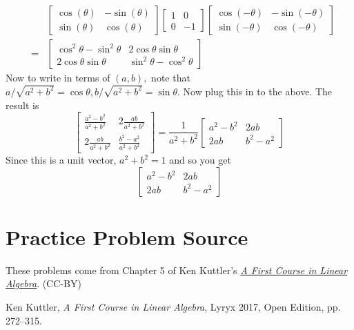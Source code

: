 \documentclass{ximera}
\begin{document}
\begin{problem}
\begin{hint}
\begin{eqnarray*}
&&\left[
\begin{array}{cc}
\cos \left( \theta \right) & -\sin \left( \theta \right) \\
\sin \left( \theta \right) & \cos \left( \theta \right)
\end{array}
\right] \left[
\begin{array}{rr}
1 & 0 \\
0 & -1
\end{array}
\right] \left[
\begin{array}{cc}
\cos \left( -\theta \right) & -\sin \left( -\theta \right) \\
\sin \left( -\theta \right) & \cos \left( -\theta \right)
\end{array}
\right] \\
&=& \left[
\begin{array}{cc}
\cos ^{2}\theta -\sin ^{2}\theta & 2\cos \theta \sin \theta \\
2\cos \theta \sin \theta & \sin ^{2}\theta -\cos ^{2}\theta%
\end{array}
\right]
\end{eqnarray*}
Now to write in terms of $\left( a,b\right) ,$ note that $a/\sqrt{a^{2}+b^{2}
}=\cos \theta ,b/\sqrt{a^{2}+b^{2}}=\sin \theta .$ Now plug this in to the
above. The result is
\[
\left[
\begin{array}{cc}
\frac{a^{2}-b^{2}}{a^{2}+b^{2}} & 2\frac{ab}{a^{2}+b^{2}} \\
2\frac{ab}{a^{2}+b^{2}} & \frac{b^{2}-a^{2}}{a^{2}+b^{2}}
\end{array}
\right] =\frac{1}{a^{2}+b^{2}}\left[
\begin{array}{cc}
a^{2}-b^{2} & 2ab \\
2ab & b^{2}-a^{2}
\end{array}
\right]
\]
Since this is a unit vector, $a^{2}+b^{2}=1$ and so you get
\[
\left[
\begin{array}{cc}
a^{2}-b^{2} & 2ab \\
2ab & b^{2}-a^{2}
\end{array}
\right]
\]
\end{hint}
\end{problem}


\section*{Practice Problem Source}
These problems come from Chapter 5 of Ken Kuttler's \href{https://open.umn.edu/opentextbooks/textbooks/a-first-course-in-linear-algebra-2017}{\it A First Course in Linear Algebra}. (CC-BY)

Ken Kuttler, {\it  A First Course in Linear Algebra}, Lyryx 2017, Open Edition, pp. 272--315.   
\end{document}
